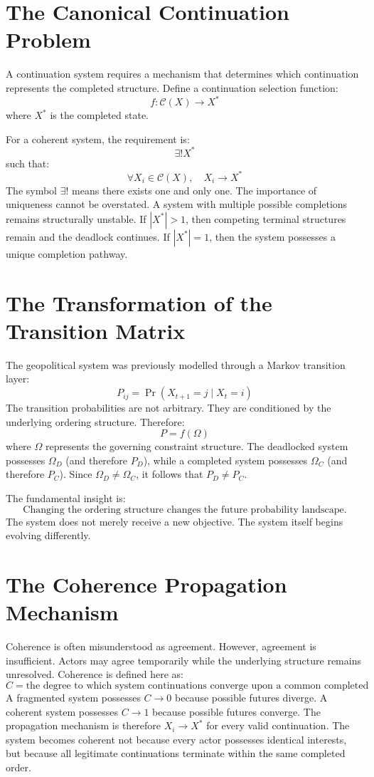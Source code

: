 \documentclass[11pt,openany]{book}
\theoremstyle{plain}
\theoremstyle{definition}
\begin{document}
\section{The Canonical Continuation Problem}

A continuation system requires a mechanism that determines which continuation represents the completed structure. Define a continuation selection function:
\[
f: \mathcal{C}(X) \longrightarrow X^*
\]
where \(X^*\) is the completed state.

For a coherent system, the requirement is:
\[
\exists ! X^*
\]
such that:
\[
\forall X_i \in \mathcal{C}(X), \quad X_i \to X^*
\]
The symbol \(\exists !\! \) means there exists one and only one. The importance of uniqueness cannot be overstated. A system with multiple possible completions remains structurally unstable. If \(|X^*| > 1\), then competing terminal structures remain and the deadlock continues. If \(|X^*| = 1\), then the system possesses a unique completion pathway.

\section{The Transformation of the Transition Matrix}

The geopolitical system was previously modelled through a Markov transition layer:
\[
P_{ij} = \Pr(X_{t+1} = j \mid X_t = i)
\]
The transition probabilities are not arbitrary. They are conditioned by the underlying ordering structure. Therefore:
\[
P = f(\Omega)
\]
where \(\Omega\) represents the governing constraint structure. The deadlocked system possesses \(\Omega_D\) (and therefore \(P_D\)), while a completed system possesses \(\Omega_C\) (and therefore \(P_C\)). Since \(\Omega_D \neq \Omega_C\), it follows that \(P_D \neq P_C\).

The fundamental insight is:
\[
\boxed{
\text{Changing the ordering structure changes the future probability landscape.}
}
\]
The system does not merely receive a new objective. The system itself begins evolving differently.

\section{The Coherence Propagation Mechanism}

Coherence is often misunderstood as agreement. However, agreement is insufficient. Actors may agree temporarily while the underlying structure remains unresolved. Coherence is defined here as:
\[
C = \text{the degree to which system continuations converge upon a common completed structure}
\]
A fragmented system possesses \(C \to 0\) because possible futures diverge. A coherent system possesses \(C \to 1\) because possible futures converge. The propagation mechanism is therefore \(X_i \to X^*\) for every valid continuation. The system becomes coherent not because every actor possesses identical interests, but because all legitimate continuations terminate within the same completed order.
\end{document}
